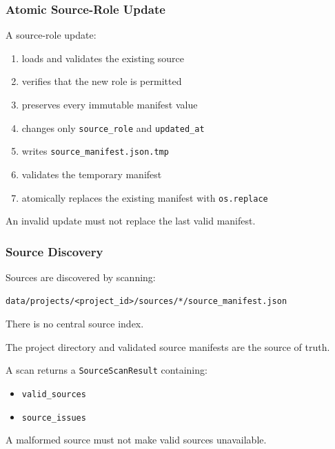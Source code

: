 \hypertarget{atomic-source-role-update}{%
\subsubsection{Atomic Source-Role Update}\label{atomic-source-role-update}}

A source-role update:

\begin{enumerate}
\def\labelenumi{\arabic{enumi}.}
\tightlist
\item
  loads and validates the existing source
\item
  verifies that the new role is permitted
\item
  preserves every immutable manifest value
\item
  changes only \texttt{source\_role} and \texttt{updated\_at}
\item
  writes \texttt{source\_manifest.json.tmp}
\item
  validates the temporary manifest
\item
  atomically replaces the existing manifest with \texttt{os.replace}
\end{enumerate}

An invalid update must not replace the last valid manifest.

\hypertarget{source-discovery}{%
\subsubsection{Source Discovery}\label{source-discovery}}

Sources are discovered by scanning:

\begin{verbatim}
data/projects/<project_id>/sources/*/source_manifest.json
\end{verbatim}

There is no central source index.

The project directory and validated source manifests are the source of truth.

A scan returns a \texttt{SourceScanResult} containing:

\begin{itemize}
\tightlist
\item
  \texttt{valid\_sources}
\item
  \texttt{source\_issues}
\end{itemize}

A malformed source must not make valid sources unavailable.

